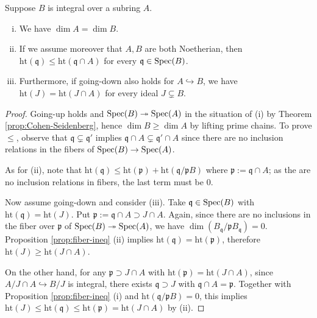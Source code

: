 \begin{proposition}\label{prop:dim-integral}
	Suppose $B$ is integral over a subring $A$.
	\begin{enumerate}[(i)]
		\item We have $\dim A = \dim B$.
		\item If we assume moreover that $A, B$ are both Noetherian, then $\mathrm{ht}(\mathfrak{q}) \leq \mathrm{ht}(\mathfrak{q} \cap A)$ for every $\mathfrak{q} \in \operatorname{Spec}(B)$.
		\item Furthermore, if going-down also holds for $A \hookrightarrow B$, we have $\mathrm{ht}(J) = \mathrm{ht}(J \cap A)$ for every ideal $J \subsetneq B$.
	\end{enumerate}
\end{proposition}
\begin{proof}
	Going-up holds and $\operatorname{Spec}(B) \twoheadrightarrow \operatorname{Spec}(A)$ in the situation of (i) by Theorem \ref{prop:Cohen-Seidenberg}, hence $\dim B \geq \dim A$ by lifting prime chains. To prove $\leq$, observe that $\mathfrak{q} \subsetneq \mathfrak{q}'$ implies $\mathfrak{q} \cap A \subsetneq \mathfrak{q}' \cap A$ since there are no inclusion relations in the fibers of $\operatorname{Spec}(B) \to \operatorname{Spec}(A)$.

	As for (ii), note that $\text{ht}(\mathfrak{q}) \leq \text{ht}(\mathfrak{p}) + \text{ht}(\mathfrak{q}/\mathfrak{p}B)$ where $\mathfrak{p} := \mathfrak{q} \cap A$; as the are no inclusion relations in fibers, the last term must be $0$.
	
	Now assume going-down and consider (iii). Take $\mathfrak{q} \in \operatorname{Spec}(B)$ with $\text{ht}(\mathfrak{q}) = \text{ht}(J)$. Put $\mathfrak{p} := \mathfrak{q} \cap A \supset J　\cap A$. Again, since there are no inclusions in the fiber over $\mathfrak{p}$ of $\operatorname{Spec}(B) \twoheadrightarrow \operatorname{Spec}(A)$, we have $\dim(B_{\mathfrak{q}}/ \mathfrak{p}B_{\mathfrak{q}}) = 0$. Proposition \ref{prop:fiber-ineq} (ii) implies $\text{ht}(\mathfrak{q})=\text{ht}(\mathfrak{p})$, therefore $\text{ht}(J) \geq \text{ht}(J \cap A)$.
	
	On the other hand, for any $\mathfrak{p} \supset J \cap A$ with $\text{ht}(\mathfrak{p}) = \text{ht}(J \cap A)$, since $A/J \cap A \hookrightarrow B/J$ is integral, there exists $\mathfrak{q} \supset J$ with $\mathfrak{q} \cap A = \mathfrak{p}$. Together with Proposition \ref{prop:fiber-ineq} (i) and $\mathrm{ht}(\mathfrak{q}/\mathfrak{p}B) = 0$, this implies $\text{ht}(J) \leq \text{ht}(\mathfrak{q}) \leq \text{ht}(\mathfrak{p}) = \text{ht}(J \cap A)$ by (ii).
\end{proof}

